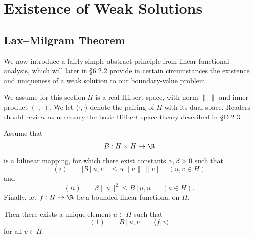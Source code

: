 \section{Existence of Weak Solutions}
\label{sec:existence-of-weak-solutions}

\subsection{Lax--Milgram Theorem}

We now introduce a fairly simple abstract principle from linear functional analysis, which will later in \S6.2.2 provide in certain circumstances the existence and uniqueness of a weak solution to our boundary-value problem.

We assume for this section $H$ is a real Hilbert space, with norm $\| \ \|$ and inner product $(\cdot,\cdot)$. We let $\langle \cdot,\cdot \rangle$ denote the pairing of $H$ with its dual space. Readers should review as necessary the basic Hilbert space theory described in \S D.2-3.

\begin{theorem}
\label{thm:lax-milgram-theorem}
Assume that
$$B : H \times H \to \R$$
is a bilinear mapping, for which there exist constants $\alpha,\beta > 0$ such that
$$(i) \qquad |B[u,v]| \leq \alpha\|u\| \, \|v\| \quad (u,v \in H)$$
and
$$(ii) \qquad \beta\|u\|^2 \leq B[u,u] \quad (u \in H).$$
Finally, let $f : H \to \R$ be a bounded linear functional on $H$.

Then there exists a unique element $u \in H$ such that
$$(1) \qquad B[u,v] = \langle f,v \rangle$$
for all $v \in H$.
\end{theorem}

